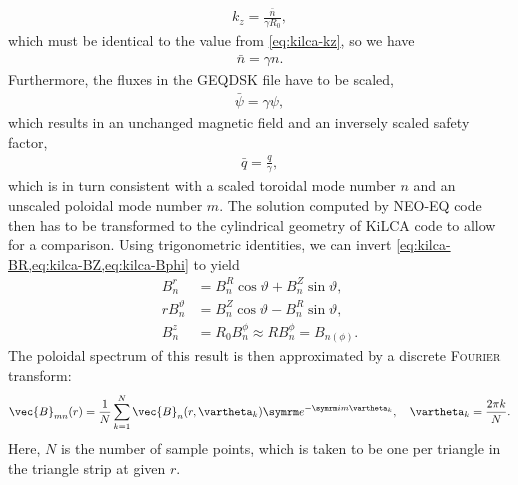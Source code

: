 \begin{gather}
  k_{z} = \frac{\bar{n}}{\gamma R_{0}},
\end{gather}
which must be identical to the value from \cref{eq:kilca-kz}, so we have
\begin{gather}
  \bar{n} = \gamma n.
\end{gather}
Furthermore, the fluxes in the GEQDSK file have to be scaled,
\begin{gather}
  \bar{\psi} = \gamma \psi,
\end{gather}
which results in an unchanged magnetic field and an inversely scaled safety factor,
\begin{gather}
  \bar{q} = \frac{q}{\gamma},
\end{gather}
which is in turn consistent with a scaled toroidal mode number $n$ and an unscaled poloidal mode number $m$. The solution computed by NEO-EQ code then has to be transformed to the cylindrical geometry of KiLCA code to allow for a comparison. Using trigonometric identities, we can invert \cref{eq:kilca-BR,eq:kilca-BZ,eq:kilca-Bphi} to yield
\begin{align}
  B_{n}^{r} &= B_{n}^{R} \cos \vartheta + B_{n}^{Z} \sin \vartheta, \\
  r B_{n}^{\vartheta} &= B_{n}^{Z} \cos \vartheta - B_{n}^{R} \sin \vartheta, \\
  B_{n}^{z} &= R_{0} B_{n}^{\phi} \approx R B_{n}^{\phi} = B_{n (\phi)}.
\end{align}
The poloidal spectrum of this result is then approximated by a discrete \textsc{Fourier} transform:
\begin{gather}
  \vec{B}_{m n} (r) = \frac{1}{N} \sum_{k = 1}^{N} \vec{B}_{n} (r, \vartheta_{k}) \e^{-\im m \vartheta_{k}}, \quad \vartheta_{k} = \frac{2 \pi k}{N}. \label{eq:DTFT}
\end{gather}
Here, $N$ is the number of sample points, which is taken to be one per triangle in the triangle strip at given $r$.

